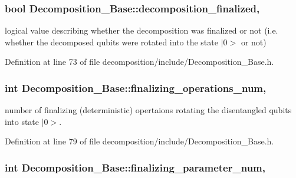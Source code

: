 \subsubsection[{\texorpdfstring{decomposition\+\_\+finalized}{decomposition_finalized}}]{\setlength{\rightskip}{0pt plus 5cm}bool Decomposition\+\_\+\+Base\+::decomposition\+\_\+finalized\hspace{0.3cm}{\ttfamily [protected]}, {\ttfamily [inherited]}}\hypertarget{class_decomposition___base_a488bfdaecfefa4fb9fb3149657b40b6d}{}\label{class_decomposition___base_a488bfdaecfefa4fb9fb3149657b40b6d}


logical value describing whether the decomposition was finalized or not (i.\+e. whether the decomposed qubits were rotated into the state $\vert$0$>$ or not) 



Definition at line 73 of file decomposition/include/\+Decomposition\+\_\+\+Base.\+h.

\subsubsection[{\texorpdfstring{finalizing\+\_\+operations\+\_\+num}{finalizing_operations_num}}]{\setlength{\rightskip}{0pt plus 5cm}int Decomposition\+\_\+\+Base\+::finalizing\+\_\+operations\+\_\+num\hspace{0.3cm}{\ttfamily [protected]}, {\ttfamily [inherited]}}\hypertarget{class_decomposition___base_a0685291401fc40fee1121eddba63a429}{}\label{class_decomposition___base_a0685291401fc40fee1121eddba63a429}


number of finalizing (deterministic) opertaions rotating the disentangled qubits into state $\vert$0$>$. 



Definition at line 79 of file decomposition/include/\+Decomposition\+\_\+\+Base.\+h.

\subsubsection[{\texorpdfstring{finalizing\+\_\+parameter\+\_\+num}{finalizing_parameter_num}}]{\setlength{\rightskip}{0pt plus 5cm}int Decomposition\+\_\+\+Base\+::finalizing\+\_\+parameter\+\_\+num\hspace{0.3cm}{\ttfamily [protected]}, {\ttfamily [inherited]}}\hypertarget{class_decomposition___base_ae83ca982ee7da29119245860d212864c}{}\label{class_decomposition___base_ae83ca982ee7da29119245860d212864c}


